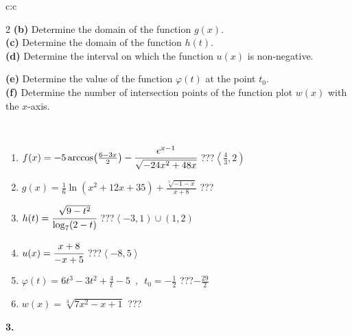 \documentclass[10pt]{report}
\begin{document}
\begin{tabular}{c:c}
\begin{minipage}[c][104.5mm][t]{0.5\linewidth}
\begin{center}
\begin{minipage}{0.95\linewidth}
\begin{center}
{\begin{multicols}{2}
\textbf{(b)} Determine the domain of the function \(g(x)\). \\[1mm]
\textbf{(c)} Determine the domain of the function \(h(t)\). \\[1mm]
\textbf{(d)} Determine the interval on which the function \(u(x)\) is non-negative. \par \columnbreak
\textbf{(e)} Determine the value of the function \(\varphi(t)\) at the point \(t_0\). \\[1mm]
\textbf{(f)} Determine the number of intersection points of the function plot \(w(x)\) with the \(x\)-axis. \\[1mm]
\end{multicols}
}
\end{center}
\end{minipage}
\\[4mm]
\begin{minipage}{0.79\linewidth}
\begin{center}
\begin{varwidth}{\linewidth}
\begin{enumerate}
\small
\item $f(x) = -5\arccos\!\left( \frac{6-3x}{2} \right) - \cfrac{e^{x-1}}{\sqrt{-24x^2+48x}}$\quad \dotfill\; ???\;\dotfill \quad $\left\langle\frac{4}{3} , 2\right)$
\item $g(x) = \frac{1}{6} \ln{\!(x^2+12x+35)}+\frac{\sqrt[3]{-1-x}}{x+8}$\quad \dotfill\; ???\;\dotfill {}
\item $h(t) = \cfrac{\sqrt{9-t^2}}{\log_7(2-t)}$\quad \dotfill\; ???\;\dotfill \quad $\left\langle-3 , 1\right)\cup\left(1 , 2\right)$
\item $u(x) = \cfrac{x+8}{-x+5}$\quad \dotfill\; ???\;\dotfill \quad $\left\langle-8 , 5\right\rangle$
\item $\varphi(t) = 6t^3-3t^2+\frac{4}{t}-5 \enspace , \enspace t_0=-\frac{1}{2}$\quad \dotfill\; ???\;\dotfill \quad $-\frac{29}{2}$
\item $w(x) = \sqrt[3]{7x^2-x+1}$\quad \dotfill\; ???\;\dotfill {}
\end{enumerate}
\end{varwidth}
\end{center}
\end{minipage}
\begin{minipage}{0.20\linewidth}
\begin{center}
{\Huge\bfseries 3.} \\[2mm]

\end{center}
\end{minipage}
\end{center}
\end{minipage}
\end{tabular}
\end{document}
